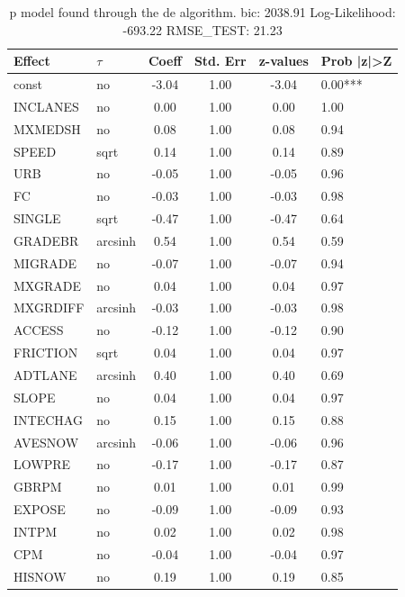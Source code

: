 \begin{table}
	\caption{p model found through the de algorithm. bic: 2038.91 Log-Likelihood: -693.22 RMSE_TEST: 21.23}
	\begin{center}
		\begin{tabular}{|l|l|c|c|c|l|}
			\hline
			Effect & $\tau$ & Coeff & Std. Err & z-values & Prob |z|>Z \\
			\hline
			const & no & -3.04 & 1.00 & -3.04 & 0.00*** \\
			\hline
			INCLANES & no & 0.00 & 1.00 & 0.00 & 1.00 \\
			\hline
			MXMEDSH & no & 0.08 & 1.00 & 0.08 & 0.94 \\
			\hline
			SPEED & sqrt & 0.14 & 1.00 & 0.14 & 0.89 \\
			\hline
			URB & no & -0.05 & 1.00 & -0.05 & 0.96 \\
			\hline
			FC & no & -0.03 & 1.00 & -0.03 & 0.98 \\
			\hline
			SINGLE & sqrt & -0.47 & 1.00 & -0.47 & 0.64 \\
			\hline
			GRADEBR & arcsinh & 0.54 & 1.00 & 0.54 & 0.59 \\
			\hline
			MIGRADE & no & -0.07 & 1.00 & -0.07 & 0.94 \\
			\hline
			MXGRADE & no & 0.04 & 1.00 & 0.04 & 0.97 \\
			\hline
			MXGRDIFF & arcsinh & -0.03 & 1.00 & -0.03 & 0.98 \\
			\hline
			ACCESS & no & -0.12 & 1.00 & -0.12 & 0.90 \\
			\hline
			FRICTION & sqrt & 0.04 & 1.00 & 0.04 & 0.97 \\
			\hline
			ADTLANE & arcsinh & 0.40 & 1.00 & 0.40 & 0.69 \\
			\hline
			SLOPE & no & 0.04 & 1.00 & 0.04 & 0.97 \\
			\hline
			INTECHAG & no & 0.15 & 1.00 & 0.15 & 0.88 \\
			\hline
			AVESNOW & arcsinh & -0.06 & 1.00 & -0.06 & 0.96 \\
			\hline
			LOWPRE & no & -0.17 & 1.00 & -0.17 & 0.87 \\
			\hline
			GBRPM & no & 0.01 & 1.00 & 0.01 & 0.99 \\
			\hline
			EXPOSE & no & -0.09 & 1.00 & -0.09 & 0.93 \\
			\hline
			INTPM & no & 0.02 & 1.00 & 0.02 & 0.98 \\
			\hline
			CPM & no & -0.04 & 1.00 & -0.04 & 0.97 \\
			\hline
			HISNOW & no & 0.19 & 1.00 & 0.19 & 0.85 \\

\end{tabular}
\end{center}
\end{table}
